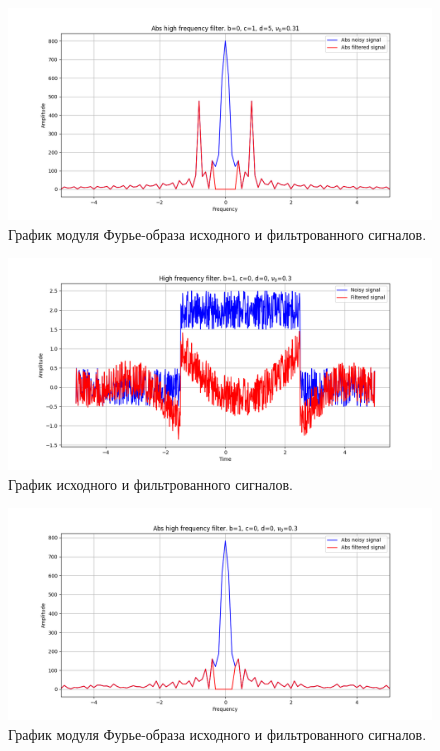 \documentclass[a4paper, 12pt]{article}
\begin{document}
    \begin{figure}[!htb]
        \centering
        \includegraphics[scale=0.485]{20_abs_u_U_nolow.png}
        \captionsetup{skip=0pt}
        \caption{График модуля Фурье-образа исходного и фильтрованного сигналов.}
        \label{fig:fig66}
    \end{figure}
    \begin{figure}[!htb]
        \centering
        \includegraphics[scale=0.485]{21_u_flt_u_nolow.png}
        \captionsetup{skip=0pt}
        \caption{График исходного и фильтрованного сигналов.}
        \label{fig:fig67}
    \end{figure}
    \begin{figure}[!htb]
        \centering
        \includegraphics[scale=0.485]{21_abs_u_U_nolow.png}
        \captionsetup{skip=0pt}
        \caption{График модуля Фурье-образа исходного и фильтрованного сигналов.}
        \label{fig:fig68}
    \end{figure}
\end{document}
